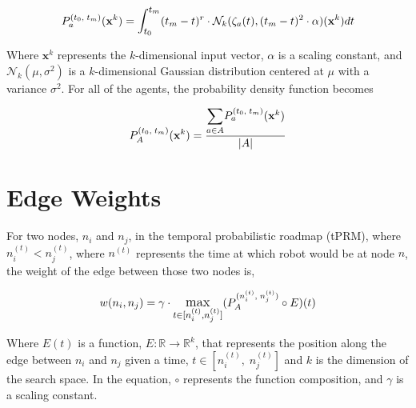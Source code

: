 \documentclass{article}
\newcommand{\Normal}[2]{\mathcal{N}_k(#1, #2)}
\newcommand{\n}[2]{\ensuremath{n^{(#2)}_{#1}}}
\newcommand{\PA}{\ensuremath{P^{(\n{i}{t},\;\n{j}{t})}_{A}}}
\newcommand{\PD}{\ensuremath{P^{(t_0,\;t_m)}_{a}}}
\newcommand{\PAll}{\ensuremath{P^{(t_0,\;t_m)}_{A}}}
\begin{document}
$$\PD(\mathbf{x}^k) = \mathlarger{\int_{t_0}^{t_m}}(t_m - t)^r
\cdot \Normal{\zeta_a(t)}{(t_m - t)^2 \cdot \alpha}(\mathbf{x}^k)dt$$

Where $\mathbf{x}^k$ represents the $k$-dimensional input vector, $\alpha$ is a
scaling constant, and $\mathcal{N}_k(\mu, \sigma^2)$ is a $k$-dimensional
Gaussian distribution centered at $\mu$ with a variance $\sigma^2$. For all of
the agents, the probability density function becomes

$$\PAll(\mathbf{x}^k) = \frac{\mathlarger{\sum_{a \in A}}
\PD(\mathbf{x}^k)}{|A|}$$

\section{Edge Weights}

For two nodes, $n_i$ and $n_j$, in the temporal probabilistic roadmap (tPRM),
where $\n{i}{t} < \n{j}{t}$, where $n^{(t)}$ represents the time at which robot
would be at node $n$, the weight of the edge between those two nodes is,

$$w(n_i, n_j) = \gamma \cdot \mathlarger{\max_{t \in [\n{i}{t},
    \n{j}{t}]}}(\PA \circ E)(t)$$

Where $E(t)$ is a function, $E: \mathbb{R} \to \mathbb{R}^k$, that represents
the position along the edge between $n_i$ and $n_j$ given a time, $t
\in [\n{i}{t},\;\n{j}{t}]$ and $k$ is the dimension of the search space. In the
equation, $\circ$ represents the function composition, and $\gamma$ is a
scaling constant.
\end{document}

